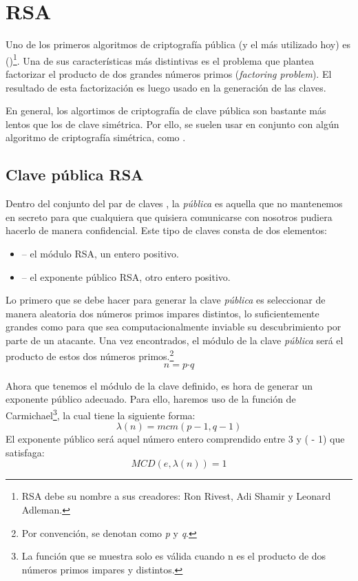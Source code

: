 
\section{RSA}

\label{RSA}

Uno de los primeros algoritmos de criptografía pública (y el más utilizado hoy) es  ()\footnote{RSA debe su nombre a sus creadores: Ron Rivest, Adi Shamir y Leonard Adleman.}.
Una de sus características más distintivas es el problema que plantea factorizar el producto de dos grandes números primos (\emph{factoring problem}).
El resultado de esta factorización es luego usado en la generación de las claves.

En general, los algortimos de criptografía de clave pública son bastante más lentos que los de clave simétrica.
Por ello, se suelen usar en conjunto con algún algoritmo de criptografía simétrica, como . \emph{\parencite{Reference9}}

\subsection{Clave pública RSA}

Dentro del conjunto del par de claves , la \emph{pública} es aquella que no mantenemos en secreto para que cualquiera que quisiera comunicarse con nosotros pudiera hacerlo de manera confidencial.
Este tipo de claves consta de dos elementos:
\begin{itemize}
  \item {} -- el módulo RSA, un entero positivo.
  \item {} -- el exponente público RSA, otro entero positivo.
\end{itemize}

Lo primero que se debe hacer para generar la clave \emph{pública} es seleccionar de manera aleatoria dos números primos impares distintos, lo suficientemente grandes como para que sea computacionalmente inviable su descubrimiento por parte de un atacante.
Una vez encontrados, el módulo  de la clave \emph{pública} será el producto de estos dos números primos.\footnote{Por convención, se denotan como \emph{p} y \emph{q}.}
\[ n = p \boldsymbol{\cdot} q \]

Ahora que tenemos el módulo de la clave definido, es hora de generar un exponente público  adecuado.
Para ello, haremos uso de la función de Carmichael\footnote{La función que se muestra solo es válida cuando n es el producto de dos números primos impares y distintos.}, la cual tiene la siguiente forma:
\[ \lambda(n) = mcm(p - 1, q - 1) \]
El exponente público  será aquel número entero comprendido entre 3 y ( - 1) que satisfaga:
\[ MCD(e, \lambda(n)) = 1 \] \emph{\parencite{Reference10}}

